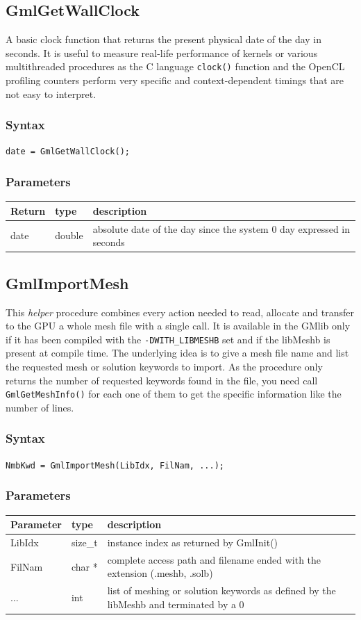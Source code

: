 \documentclass[a4paper,12pt]{article}
\begin{document}
\subsection{GmlGetWallClock}
A basic clock function that returns the present physical date of the day in seconds. It is useful to measure real-life performance of kernels or various multithreaded procedures as the C language {\tt clock()} function and the OpenCL profiling counters perform very specific and context-dependent timings that are not easy to interpret.

\subsubsection*{Syntax}
{\tt date = GmlGetWallClock();}

\subsubsection*{Parameters}
\begin{tabular}{|m{2cm}|m{1.5cm}|m{10.5cm}|}
\hline
Return     & type    & description \\
\hline
date       & double & absolute date of the day since the system 0 day expressed in seconds \\
\hline
\end{tabular}


\subsection{GmlImportMesh}
This \emph{helper} procedure combines every action needed to read, allocate and transfer to the GPU a whole mesh file with a single call. It is available in the GMlib only if it has been compiled with the {\tt -DWITH\_LIBMESHB} set and if the libMeshb is present at compile time. The underlying idea is to give a mesh file name and list the requested mesh or solution keywords to import. As the procedure only returns the number of requested keywords found in the file, you need call {\tt GmlGetMeshInfo()} for each one of them to get the specific information like the number of lines.

\subsubsection*{Syntax}
{\tt NmbKwd = GmlImportMesh(LibIdx, FilNam, ...);}

\subsubsection*{Parameters}
\begin{tabular}{|m{2cm}|m{1.5cm}|m{10.5cm}|}
\hline
Parameter  & type    & description \\
\hline
LibIdx     & size\_t & instance index as returned by GmlInit() \\
\hline
FilNam     & char *  & complete access path and filename ended with the extension (.meshb, .solb) \\
\hline
...        & int     & list of meshing or solution keywords as defined by the libMeshb and terminated by a 0 \\
\hline
\end{tabular}
\end{document}
